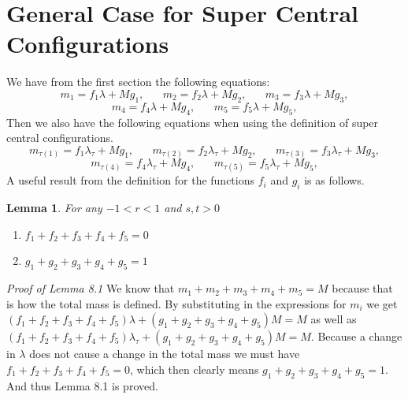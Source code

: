 \documentclass[11pt,leqno]{article}
\newtheorem{lemma}[theorem]{Lemma}
\theoremstyle{definition}
\theoremstyle{remark}
\numberwithin{equation}{section}
\begin{document}
\section{General Case for Super Central Configurations}
We have from the first section the following equations:
$$m_1=f_1\lambda+Mg_1, \hspace{20pt} m_2=f_2\lambda+Mg_2, \hspace{20pt} m_3=f_3\lambda+Mg_3,$$
$$m_4=f_4\lambda+Mg_4, \hspace{20pt} m_5=f_5\lambda+Mg_5,$$
Then we also have the following equations when using the definition of super central configurations.
$$m_{\tau(1)}=f_1\lambda_\tau+Mg_1, \hspace{20pt} m_{\tau(2)}=f_2\lambda_\tau+Mg_2, \hspace{20pt} m_{\tau(3)}=f_3\lambda_\tau+Mg_3,$$
$$m_{\tau(4)}=f_4\lambda_\tau+Mg_4, \hspace{20pt} m_{\tau(5)}=f_5\lambda_\tau+Mg_5,$$
A useful result from the definition for the functions $f_i$ and $g_i$ is as follows.
\begin{lemma}
For any $-1<r<1$ and $s,t>0$
\begin{enumerate}
\item $f_1+f_2+f_3+f_4+f_5=0$
\item $g_1+g_2+g_3+g_4+g_5=1$
\end{enumerate}
\end{lemma}

\textit{Proof of Lemma 8.1}
We know that $m_1+m_2+m_3+m_4+m_5=M$ because that is how the total mass is defined. By substituting in the expressions for $m_i$ we get $(f_1+f_2+f_3+f_4+f_5)\lambda+(g_1+g_2+g_3+g_4+g_5)M=M$ as well as $(f_1+f_2+f_3+f_4+f_5)\lambda_\tau+(g_1+g_2+g_3+g_4+g_5)M=M$. 
Because a change in $\lambda$ does not cause a change in the total mass we must have $f_1+f_2+f_3+f_4+f_5=0$, which then clearly means $g_1+g_2+g_3+g_4+g_5=1$. And thus Lemma 8.1 is proved.
\end{document}
